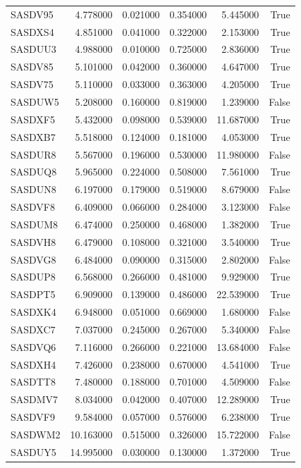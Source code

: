 \begin{tabular}{lrrrrr}
SASDV95 & 4.778000 & 0.021000 & 0.354000 & 5.445000 & True \\
SASDXS4 & 4.851000 & 0.041000 & 0.322000 & 2.153000 & True \\
SASDUU3 & 4.988000 & 0.010000 & 0.725000 & 2.836000 & True \\
SASDV85 & 5.101000 & 0.042000 & 0.360000 & 4.647000 & True \\
SASDV75 & 5.110000 & 0.033000 & 0.363000 & 4.205000 & True \\
SASDUW5 & 5.208000 & 0.160000 & 0.819000 & 1.239000 & False \\
SASDXF5 & 5.432000 & 0.098000 & 0.539000 & 11.687000 & True \\
SASDXB7 & 5.518000 & 0.124000 & 0.181000 & 4.053000 & True \\
SASDUR8 & 5.567000 & 0.196000 & 0.530000 & 11.980000 & False \\
SASDUQ8 & 5.965000 & 0.224000 & 0.508000 & 7.561000 & True \\
SASDUN8 & 6.197000 & 0.179000 & 0.519000 & 8.679000 & False \\
SASDVF8 & 6.409000 & 0.066000 & 0.284000 & 3.123000 & False \\
SASDUM8 & 6.474000 & 0.250000 & 0.468000 & 1.382000 & True \\
SASDVH8 & 6.479000 & 0.108000 & 0.321000 & 3.540000 & True \\
SASDVG8 & 6.484000 & 0.090000 & 0.315000 & 2.802000 & False \\
SASDUP8 & 6.568000 & 0.266000 & 0.481000 & 9.929000 & True \\
SASDPT5 & 6.909000 & 0.139000 & 0.486000 & 22.539000 & True \\
SASDXK4 & 6.948000 & 0.051000 & 0.669000 & 1.680000 & False \\
SASDXC7 & 7.037000 & 0.245000 & 0.267000 & 5.340000 & False \\
SASDVQ6 & 7.116000 & 0.266000 & 0.221000 & 13.684000 & False \\
SASDXH4 & 7.426000 & 0.238000 & 0.670000 & 4.541000 & True \\
SASDTT8 & 7.480000 & 0.188000 & 0.701000 & 4.509000 & False \\
SASDMV7 & 8.034000 & 0.042000 & 0.407000 & 12.289000 & True \\
SASDVF9 & 9.584000 & 0.057000 & 0.576000 & 6.238000 & True \\
SASDWM2 & 10.163000 & 0.515000 & 0.326000 & 15.722000 & False \\
SASDUY5 & 14.995000 & 0.030000 & 0.130000 & 1.372000 & True \\
\bottomrule
\end{tabular}
